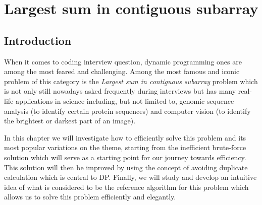 
\chapter{Largest sum in contiguous subarray}
\label{ch:max_sum_continguous_subarray}
\section*{Introduction}
When it comes to coding interview question, dynamic programming ones are among the most feared and challenging.
Among the most famous and iconic problem of this category is the \textit{Largest sum in contiguous subarray} problem which
is not only still nowadays asked frequently during interviews but has many real-life applications in science including, but not limited to, genomic sequence analysis (to identify certain protein sequences) and computer vision (to identify the brightest or darkest part of an
image). 

In this chapter we will investigate how to efficiently solve this problem and its most popular variations on the theme, starting from the inefficient brute-force solution which will serve as a starting point for our journey towards efficiency. This solution will then be improved by using the concept of avoiding duplicate calculation which is central to DP. 
Finally, we will study and develop an intuitive idea of what is considered to be the reference algorithm for this problem which allows us to solve this problem efficiently and elegantly.

